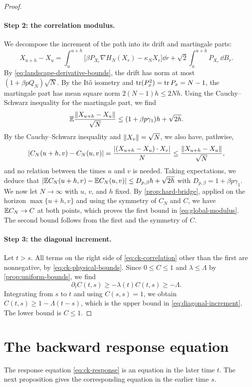\begin{proof}
\paragraph{Step 2: the correlation modulus.}
We decompose the increment of the path into its drift and martingale parts:
\[
 X_{u+h}-X_u=\int_u^{u+h}\bigl[\beta P_{X_r}\nabla H_N(X_r)-\kappa_NX_r\bigr]\dd r+\sqrt2\int_u^{u+h}P_{X_r}\,\dd B_r.
\]
By \eqref{eq:landscape-derivative-bounds}, the drift has norm at most $(1+\beta pQ_N)\sqrt N$. By the It\^o isometry and $\operatorname{tr}(P_x^2)=\operatorname{tr} P_x=N-1$, the martingale part has mean square norm $2(N-1)h\le2Nh$. Using the Cauchy--Schwarz inequality for the martingale part, we find
\[
 \mathbb E\frac{\lVert X_{u+h}-X_u\rVert}{\sqrt N}\le(1+\beta p\gamma_1)h+\sqrt{2h}.
\]
By the Cauchy--Schwarz inequality and $\lVert X_v\rVert=\sqrt N$, we also have, pathwise,
\[
 |C_N(u+h,v)-C_N(u,v)|=\frac{|(X_{u+h}-X_u)\cdot X_v|}N\le\frac{\lVert X_{u+h}-X_u\rVert}{\sqrt N},
\]
and no relation between the times $u$ and $v$ is needed. Taking expectations, we deduce that $|\mathbb E C_N(u+h,v)-\mathbb E C_N(u,v)|\le D_{p,\beta}h+\sqrt{2h}$ with $D_{p,\beta}=1+\beta p\gamma_1$. We now let $N\to\infty$ with $u$, $v$, and $h$ fixed. By \cref{prop:hard-bridge}, applied on the horizon $\max\{u+h,v\}$ and using the symmetry of $C_N$ and $C$, we have $\mathbb E C_N\to C$ at both points, which proves the first bound in \eqref{eq:global-modulus}. The second bound follows from the first and the symmetry of $C$.

\paragraph{Step 3: the diagonal increment.}
Let $t>s$. All terms on the right side of \eqref{eq:ck-correlation} other than the first are nonnegative, by \eqref{eq:ck-physical-bounds}. Since $0\le C\le1$ and $\lambda\le\Lambda$ by \cref{prop:uniform-bounds}, we find
\[
 \partial_tC(t,s)\ge-\lambda(t)C(t,s)\ge-\Lambda.
\]
Integrating from $s$ to $t$ and using $C(s,s)=1$, we obtain $C(t,s)\ge1-\Lambda(t-s)$, which is the upper bound in \eqref{eq:diagonal-increment}. The lower bound is $C\le1$.
\end{proof}

\section{The backward response equation}\label{sec:backward-response}

The response equation \eqref{eq:ck-response} is an equation in the later time $t$. The next proposition gives the corresponding equation in the earlier time $s$.


